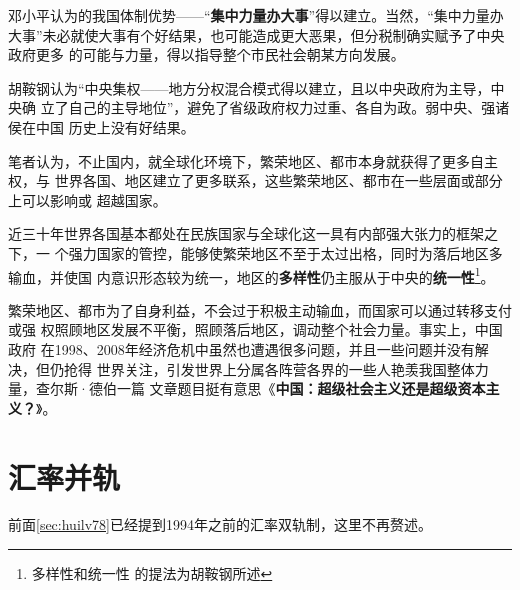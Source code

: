 邓小平认为的我国体制优势——“\textbf{集中力量办大事}”得以建立。当然，“集中力量办
大事”未必就使大事有个好结果，也可能造成更大恶果，但分税制确实赋予了中央政府更多
的可能与力量，得以指导整个市民社会朝某方向发展。

胡鞍钢认为“中央集权——地方分权混合模式得以建立，且以中央政府为主导，中央确
立了自己的主导地位”，避免了省级政府权力过重、各自为政。弱中央、强诸侯在中国
历史上没有好结果。

笔者认为，不止国内，就全球化环境下，繁荣地区、都市本身就获得了更多自主权，与
世界各国、地区建立了更多联系，这些繁荣地区、都市在一些层面或部分上可以影响或
超越国家。

近三十年世界各国基本都处在民族国家与全球化这一具有内部强大张力的框架之下，一
个强力国家的管控，能够使繁荣地区不至于太过出格，同时为落后地区多输血，并使国
内意识形态较为统一，地区的\textbf{多样性}仍主服从于中央的\textbf{统一性}\footnote{多样性和统一性
  的提法为胡鞍钢所述}。

繁荣地区、都市为了自身利益，不会过于积极主动输血，而国家可以通过转移支付或强
权照顾地区发展不平衡，照顾落后地区，调动整个社会力量。事实上，中国政府
在1998、2008年经济危机中虽然也遭遇很多问题，并且一些问题并没有解决，但仍抢得
世界关注，引发世界上分属各阵营各界的一些人艳羡我国整体力量，查尔斯·德伯一篇
文章题目挺有意思《\textbf{中国：超级社会主义还是超级资本主义？}》。

\section{汇率并轨}

前面\cref{sec:huilv78}已经提到1994年之前的汇率双轨制，这里不再赘述。












